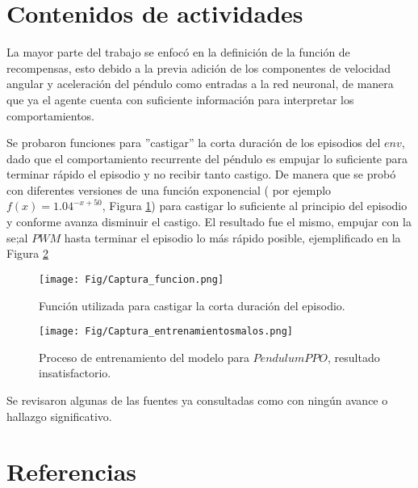 \documentclass[12pt]{article}
\begin{document}
\newpage

\section*{Contenidos de actividades}

La mayor parte del trabajo se enfocó en la definición de la función de recompensas, esto debido a la previa adición de los componentes de velocidad angular y aceleración del péndulo como entradas a la red neuronal, de manera que ya el agente cuenta con suficiente información para interpretar los comportamientos.

Se probaron funciones para ''castigar'' la corta duración de los episodios del $env$, dado que el comportamiento recurrente del péndulo es empujar lo suficiente para terminar rápido el episodio y no recibir tanto castigo. De manera que se probó con diferentes versiones de una función exponencial ( por ejemplo $f(x) = 1.04^{-x+50}$, Figura \ref{fig:funcion}) para castigar lo suficiente al principio del episodio y conforme avanza disminuir el castigo. El resultado fue el mismo, empujar con la se;al $PWM$ hasta terminar el episodio lo más rápido posible, ejemplificado en la Figura \ref{fig:PendPPOcaptura}

\begin{figure}[h!]
	\centering
	\texttt{[image: Fig/Captura\_funcion.png]}
	\caption{Función utilizada para castigar la corta duración del episodio.}
	\label{fig:funcion}
\end{figure}	

\begin{figure}[h!]
	\centering
	\texttt{[image: Fig/Captura\_entrenamientosmalos.png]}
	\caption{Proceso de entrenamiento del modelo para $PendulumPPO$, resultado insatisfactorio.}
	\label{fig:PendPPOcaptura}
\end{figure}	

Se revisaron algunas de las fuentes ya consultadas como \cite{PPObeginners} con ningún avance o hallazgo significativo.

\newpage

\section*{Referencias}
\renewcommand\refname{}


\end{document}
